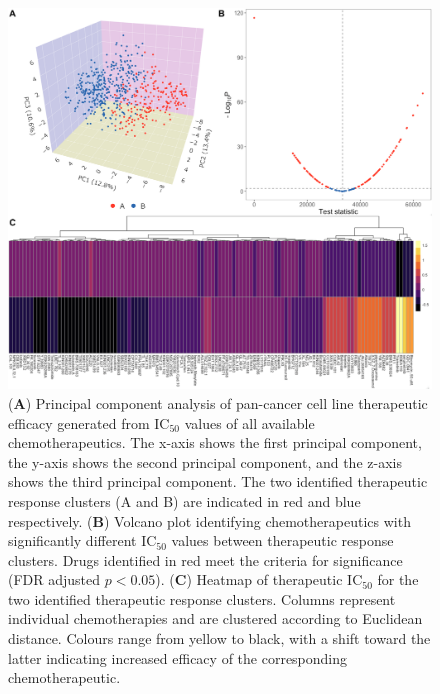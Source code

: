 \documentclass[10pt, letterpaper, twocolumn]{article}
\begin{document}
\begin{figure}[!ht]
    \centering
    \includegraphics[width=\textwidth]{Figures/clustering.png}

    \caption{(\textbf{A}) Principal component analysis of pan-cancer cell line therapeutic efficacy generated from IC$_{50}$ values of all available chemotherapeutics. The x-axis shows the first principal component, the y-axis shows the second principal component, and the z-axis shows the third principal component. The two identified therapeutic response clusters (A and B) are indicated in red and blue respectively. (\textbf{B}) Volcano plot identifying chemotherapeutics with significantly different IC$_{50}$ values between therapeutic response clusters. Drugs identified in red meet the criteria for significance (FDR adjusted $p<0.05$). (\textbf{C}) Heatmap of therapeutic IC$_{50}$ for the two identified therapeutic response clusters. Columns represent individual chemotherapies and are clustered according to Euclidean distance. Colours range from yellow to black, with a shift toward the latter indicating increased efficacy of the corresponding chemotherapeutic.}
    \label{fig:clustering}
\end{figure}
\end{document}
